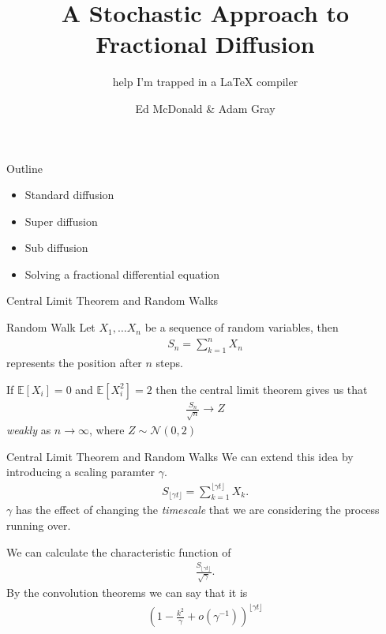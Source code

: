\documentclass[pdf]{beamer}
\title{A Stochastic Approach to Fractional Diffusion}
\subtitle{help I'm trapped in a LaTeX compiler}
\author{Ed McDonald \& Adam Gray}
\institute{
	School of Mathematics and Statistics \\
	University of New South Wales
}
\newcommand{\lra}{\longrightarrow}
\begin{document}
\begin{frame}
	\titlepage
\end{frame}

\begin{frame}{Outline}
    \begin{itemize}
        \item Standard diffusion
        \item Super diffusion
        \item Sub diffusion
        \item Solving a fractional differential equation
    \end{itemize}
\end{frame}


\begin{frame}{Central Limit Theorem and Random Walks}
	\begin{block}{Random Walk}
	    Let $ X_1, \ldots X_n $ be a sequence of random variables,
	    then 
	    \begin{align}
	        S_n = \sum_{k=1}^n X_n 
	    \end{align}
	    represents the position after $ n $ steps.
	\end{block}
	If $ \mathbb{E}[X_i] = 0 $ and  $ \mathbb{E}[X_i^2] = 2 $ then the central limit theorem gives us that
	\begin{align}
	    \frac{S_n}{\sqrt{n}} \lra Z
	\end{align}
	\emph{weakly} as $ n \lra \infty $, where $ Z \sim \mathcal{N}(0,2) $
\end{frame}

\begin{frame}{Central Limit Theorem and Random Walks}
    We can extend this idea by introducing a scaling paramter $ \gamma $.
    \begin{align}
        S_{\lfloor \gamma t \rfloor} = \sum_{k=1}^{\lfloor \gamma t \rfloor} X_k.
    \end{align}
    $ \gamma $ has the effect of changing the \emph{timescale} that we are considering the process running over.
    
    We can calculate the characteristic function of 
    \begin{align}
       \frac{S_{\lfloor \gamma t \rfloor}}{\sqrt{\gamma }}.
    \end{align}
    By the convolution theorems we can say that it is
    \begin{align}
        \left( 1- \frac{k^2}{\gamma} + o(\gamma^{-1}) \right)^{\lfloor \gamma t \rfloor}
    \end{align}
\end{frame}
\end{document}
